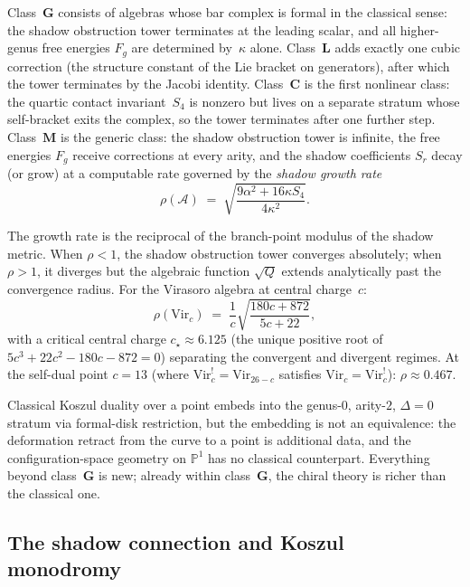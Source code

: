 \documentclass[11pt,reqno]{amsart}
\theoremstyle{definition}
\theoremstyle{remark}
\newcommand{\cA}{\mathcal{A}}
\newcommand{\Vir}{\mathrm{Vir}}
\numberwithin{equation}{section}
\begin{document}
\noindent
Class~$\mathbf{G}$ consists of algebras whose bar
complex is formal in the classical sense: the shadow obstruction tower
terminates at the leading scalar, and all higher-genus free
energies $F_g$ are determined by~$\kappa$ alone.
Class~$\mathbf{L}$ adds exactly one cubic correction (the
structure constant of the Lie bracket on generators), after which
the tower terminates by the Jacobi identity.
Class~$\mathbf{C}$ is the first nonlinear class: the quartic
contact invariant~$S_4$ is nonzero but lives on a separate
stratum whose self-bracket exits the complex, so the tower
terminates after one further step.
Class~$\mathbf{M}$ is the generic class: the shadow obstruction tower is
infinite, the free energies $F_g$ receive corrections at every
arity, and the shadow coefficients $S_r$ decay (or grow) at a
computable rate governed by the \emph{shadow growth rate}
\begin{equation}\label{eq:intro-growth-rate}
 \rho(\cA)
 \;=\;
 \sqrt{\frac{9\alpha^2 + 16\kappa S_4}{4\kappa^2}}.
\end{equation}

The growth rate is the reciprocal of the branch-point modulus
of the shadow metric. When $\rho < 1$, the shadow obstruction tower converges
absolutely; when $\rho > 1$, it diverges but the algebraic
function $\sqrt{Q}$ extends analytically past the convergence
radius. For the Virasoro algebra at central charge~$c$:
\begin{equation}\label{eq:intro-virasoro-rho}
 \rho(\Vir_c)
 \;=\;
 \frac{1}{c}\sqrt{\frac{180c + 872}{5c + 22}},
\end{equation}
with a critical central charge $c_\star \approx 6.125$ (the
unique positive root of $5c^3 + 22c^2 - 180c - 872 = 0$)
separating the convergent and divergent regimes. At the
self-dual point $c = 13$ (where $\Vir_c^! = \Vir_{26-c}$ satisfies
$\Vir_c = \Vir_c^!$): $\rho \approx 0.467$.

Classical Koszul duality over a point embeds into the
genus-$0$, arity-$2$, $\Delta = 0$ stratum via formal-disk
restriction, but the embedding is not an equivalence:
the deformation retract from the curve to a point is
additional data, and the configuration-space geometry on
$\mathbb{P}^1$ has no classical counterpart.
Everything beyond class~$\mathbf{G}$ is new; already within
class~$\mathbf{G}$, the chiral theory is richer than the
classical one.

\subsection{The shadow connection and Koszul monodromy}
\end{document}
